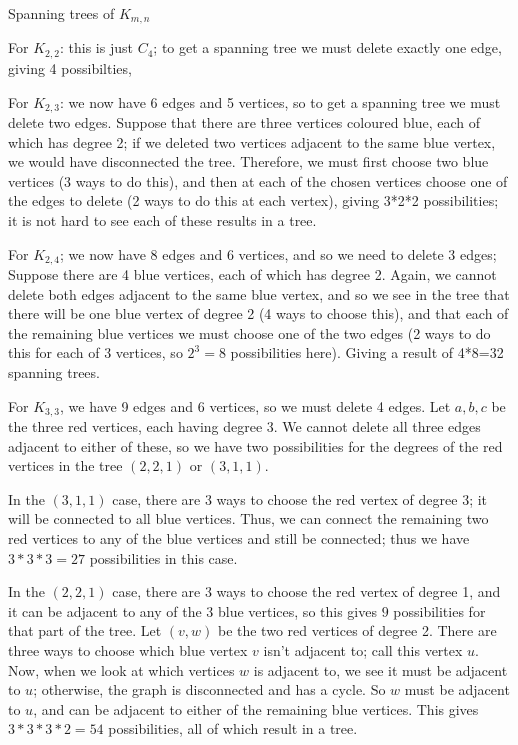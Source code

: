 \documentclass{amsart}
\begin{document}
Spanning trees of $K_{m,n}$

For $K_{2,2}$: this is just $C_4$; to get a spanning tree we must delete exactly one edge, giving 4 possibilties,

For $K_{2,3}$: we now have 6 edges and 5 vertices, so to get a spanning tree we must delete two edges.  Suppose that there are three vertices coloured blue, each of which has degree 2; if we deleted two vertices adjacent to the same blue vertex, we would have disconnected the tree.  Therefore, we must first choose two blue vertices (3 ways to do this), and then at each of the chosen vertices choose one of the edges to delete (2 ways to do this at each vertex), giving 3*2*2 possibilities; it is not hard to see each of these results in a tree.

For $K_{2,4}$; we now have 8 edges and 6 vertices, and so we need to delete 3 edges; Suppose there are 4 blue vertices, each of which has degree 2.  Again, we cannot delete both edges adjacent to the same blue vertex, and so we see in the tree that there will be one blue vertex of degree 2 (4 ways to choose this), and that each of the remaining blue vertices we must choose one of the two edges (2 ways to do this for each of 3 vertices, so $2^3=8$ possibilities here).  Giving a result of 4*8=32 spanning trees.

For $K_{3,3}$, we have 9 edges and 6 vertices, so we must delete 4 edges.  Let $a,b,c$ be the three red vertices, each having degree 3.  We cannot delete all three edges adjacent to either of these, so we have two possibilities for the degrees of the red vertices in the tree $(2,2,1)$ or $(3,1,1)$.

In the $(3,1,1)$ case, there are 3 ways to choose the red vertex of degree 3; it will be connected to all blue vertices.  Thus, we can connect the remaining two red vertices to any of the blue vertices and still be connected; thus we have $3*3*3=27$ possibilities in this case.

In the $(2,2,1)$ case, there are 3 ways to choose the red vertex of degree 1, and it can be adjacent to any of the 3 blue vertices, so this gives $9$ possibilities for that part of the tree.  Let $(v,w)$ be the two red vertices of degree 2.  There are three ways to choose which blue vertex $v$ isn't adjacent to; call this vertex $u$.  Now, when we look at which vertices $w$ is adjacent to, we see it must be adjacent to $u$; otherwise, the graph is disconnected and has a cycle.  So $w$ must be adjacent to $u$, and can be adjacent to either of the remaining blue vertices.  This gives $3*3*3*2=54$ possibilities, all of which result in a tree.
\end{document}
